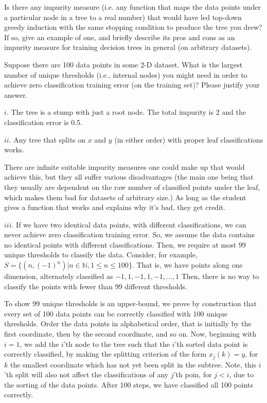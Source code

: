 Is there any impurity measure (i.e. any function that maps the data points under a particular node in a tree to a real number) that would have led top-down greedy induction with the same stopping condition to produce the tree you drew?  If so, give an example of one, and briefly describe its pros and cons as an impurity measure for training decision trees in general (on arbitrary datasets). 

\subproblem[5] Suppose there are 100 data points in some 2-D dataset. What is the largest number of unique thresholds (i.e., internal nodes) you might need in order to achieve zero classification training error (on the training set)? Please
justify your answer.

\begin{solution}
$i.$ The tree is a stump with just a root node. The total impurity is 2 and the classification error is 0.5.

$ii.$ Any tree that splits on $x$ and $y$ (in either order) with proper leaf classifications works.
        
        There are infinite suitable impurity measures one could make up that would achieve this, but they all suffer various disadvantages (the main one being that they usually are dependent on the raw number of classified points under the leaf, which makes them bad for datasets of arbitrary size.)  As long as the student gives a function that works and explains why it's bad, they get credit.

    $iii$. If we have two identical data points, with different classifications, we can never achieve zero classification training error. So, we assume the data contains no identical points with different classifications. Then, we require at most 99 unique thresholds to classify the data. Consider, for
example, $S = \{(n, (-1)^n) | n \in \mathbb{N}, 1 \leq n \leq 100\}$. That is, we have points along one dimension, alternately classified as $-1, 1, -1, 1,-1, \hdots, 1$ Then, there is no
way to classify the points with fewer than 99 different thresholds.

    To show 99 unique thresholds is an upper-bound, we prove by construction that every set of 100 data points can be correctly classified with 100 unique thresholds. Order the data points in alphabetical order, that is initially by the first coordinate, then by the second coordinate, and so on. Now, beginning with $i= 1$, we add the $i$'th node to the tree such that the $i$'th sorted data point is correctly classified, by making the splitting criterion of the form $x_j(k) = y$, for $k$ the smallest coordinate which has not yet been split in the subtree. Note, this $i$'th split will also not affect the classifications of any $j$'th poin, for $j<i$, due to the sorting of the data points. After 100 steps, we have classified all 100 points correctly.
\end{solution}


